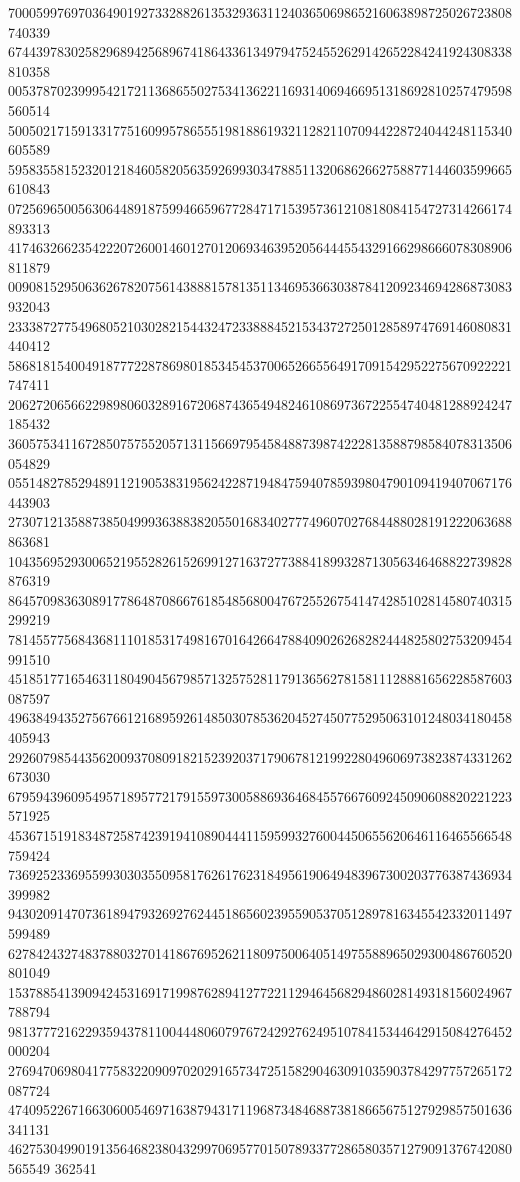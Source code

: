 \documentclass[10pt]{article}
\begin{document}
700059976970364901927332882613532936311240365069865216063898725026723808740339 674439783025829689425689674186433613497947524552629142652284241924308338810358 005378702399954217211368655027534136221169314069466951318692810257479598560514 500502171591331775160995786555198188619321128211070944228724044248115340605589 595835581523201218460582056359269930347885113206862662758877144603599665610843 072569650056306448918759946659677284717153957361210818084154727314266174893313 417463266235422207260014601270120693463952056444554329166298666078308906811879 009081529506362678207561438881578135113469536630387841209234694286873083932043 233387277549680521030282154432472338884521534372725012858974769146080831440412 586818154004918777228786980185345453700652665564917091542952275670922221747411 206272065662298980603289167206874365494824610869736722554740481288924247185432 360575341167285075755205713115669795458488739874222813588798584078313506054829 055148278529489112190538319562422871948475940785939804790109419407067176443903 273071213588738504999363883820550168340277749607027684488028191222063688863681 104356952930065219552826152699127163727738841899328713056346468822739828876319 864570983630891778648708667618548568004767255267541474285102814580740315299219 781455775684368111018531749816701642664788409026268282444825802753209454991510 451851771654631180490456798571325752811791365627815811128881656228587603087597 496384943527567661216895926148503078536204527450775295063101248034180458405943 292607985443562009370809182152392037179067812199228049606973823874331262673030 679594396095495718957721791559730058869364684557667609245090608820221223571925 453671519183487258742391941089044411595993276004450655620646116465566548759424 736925233695599303035509581762617623184956190649483967300203776387436934399982 943020914707361894793269276244518656023955905370512897816345542332011497599489 627842432748378803270141867695262118097500640514975588965029300486760520801049 153788541390942453169171998762894127722112946456829486028149318156024967788794 981377721622935943781100444806079767242927624951078415344642915084276452000204 276947069804177583220909702029165734725158290463091035903784297757265172087724 474095226716630600546971638794317119687348468873818665675127929857501636341131 462753049901913564682380432997069577015078933772865803571279091376742080565549 362541
\end{document}
